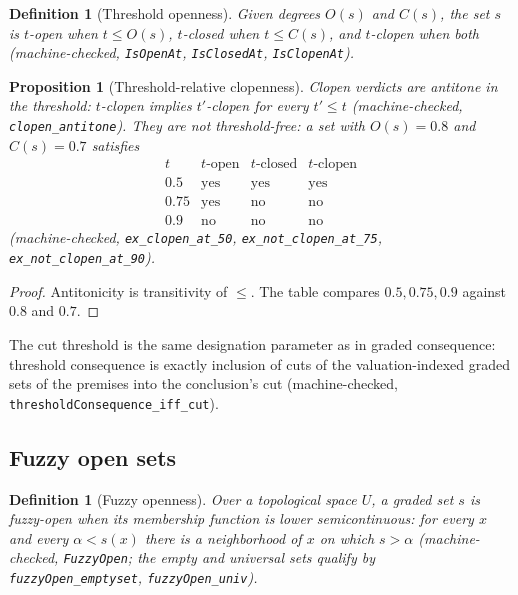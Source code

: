\documentclass[11pt,a4paper]{article}
\newtheorem{proposition}[theorem]{Proposition}
\newtheorem{definition}[theorem]{Definition}
\begin{document}
\begin{definition}[Threshold openness]
\label{def:topen}
Given degrees $O(s)$ and $C(s)$, the set $s$ is \emph{$t$-open} when
$t \le O(s)$, \emph{$t$-closed} when $t \le C(s)$, and
\emph{$t$-clopen} when both
(machine-checked, \texttt{IsOpenAt}, \texttt{IsClosedAt},
\texttt{IsClopenAt}).
\end{definition}

\begin{proposition}[Threshold-relative clopenness]
\label{thm:tclopen}
Clopen verdicts are antitone in the threshold: $t$-clopen implies
$t'$-clopen for every $t' \le t$
(machine-checked, \texttt{clopen\_antitone}).
They are not threshold-free: a set with $O(s) = 0.8$ and $C(s) = 0.7$
satisfies
\[
\begin{array}{c|ccc}
  t & \text{$t$-open} & \text{$t$-closed} & \text{$t$-clopen} \\
  \hline
  0.5 & \text{yes} & \text{yes} & \text{yes} \\
  0.75 & \text{yes} & \text{no} & \text{no} \\
  0.9 & \text{no} & \text{no} & \text{no}
\end{array}
\]
(machine-checked, \texttt{ex\_clopen\_at\_50},
\texttt{ex\_not\_clopen\_at\_75}, \texttt{ex\_not\_clopen\_at\_90}).
\end{proposition}
\begin{proof}
Antitonicity is transitivity of $\le$.
The table compares $0.5, 0.75, 0.9$ against $0.8$ and $0.7$.
\end{proof}

The cut threshold is the same designation parameter as in graded
consequence: threshold consequence is exactly inclusion of cuts of the
valuation-indexed graded sets of the premises into the conclusion's cut
(machine-checked, \texttt{thresholdConsequence\_iff\_cut}).

\subsection{Fuzzy open sets}

\begin{definition}[Fuzzy openness]
\label{def:fuzzyopen}
Over a topological space $U$, a graded set $s$ is \emph{fuzzy-open}
when its membership function is lower semicontinuous: for every $x$
and every $\alpha < s(x)$ there is a neighborhood of $x$ on which
$s > \alpha$
(machine-checked, \texttt{FuzzyOpen}; the empty and universal sets
qualify by \texttt{fuzzyOpen\_emptyset}, \texttt{fuzzyOpen\_univ}).
\end{definition}
\end{document}
